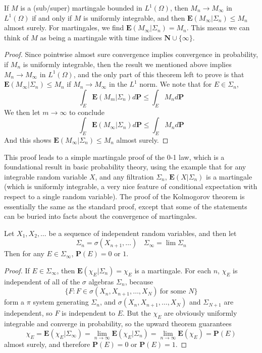 \begin{corollary}
    If $M$ is a (sub/super) martingale bounded in $L^1(\Omega)$, then $M_n \to M_\infty$ in $L^1(\Omega)$ if and only if $M$ is uniformly integrable, and then $\mathbf{E}(M_\infty | \Sigma_n) \leq M_n$ almost surely. For martingales, we find $\mathbf{E}(M_\infty | \Sigma_n) = M_n$. This means we can think of $M$ as being a martingale with time indices $\mathbf{N} \cup \{ \infty \}$.
\end{corollary}
\begin{proof}
    Since pointwise almost sure convergence implies convergence in probability, if $M_n$ is uniformly integrable, then the result we mentioned above implies $M_n \to M_\infty$ in $L^1(\Omega)$, and the only part of this theorem left to prove is that $\mathbf{E}(M_\infty|\Sigma_n) \leq M_n$ if $M_n \to M_\infty$ in the $L^1$ norm. We note that for $E \in \Sigma_n$,
    \[ \int_E \mathbf{E}(M_m|\Sigma_n) d\mathbf{P} \leq \int_E M_n d\mathbf{P}  \]
    We then let $m \to \infty$ to conclude
    \[ \int_E \mathbf{E}(M_\infty|\Sigma_n) d\mathbf{P} \leq \int_E M_n d\mathbf{P} \]
    And this shows $\mathbf{E}(M_\infty|\Sigma_n) \leq M_n$ almost surely.
\end{proof}

This proof leads to a simple martingale proof of the 0-1 law, which is a foundational result in basic probability theory, using the example that for any integrable random variable $X$, and any filtration $\Sigma_n$, $\mathbf{E}(X|\Sigma_n)$ is a martingale (which is uniformly integrable, a very nice feature of conditional expectation with respect to a single random variable). The proof of the Kolmogorov theorem is essentially the same as the standard proof, except that some of the statements can be buried into facts about the convergence of martingales.

\begin{corollary}
    Let $X_1, X_2, \dots$ be a sequence of independent random variables, and then let
    \[ \Sigma_n = \sigma(X_{n+1}, \dots)\ \ \ \ \Sigma_\infty = \lim \Sigma_n \]
    Then for any $E \in \Sigma_\infty$, $\mathbf{P}(E) = 0$ or $1$.
\end{corollary}
\begin{proof}
    If $E \in \Sigma_\infty$, then $\mathbf{E}(\chi_E | \Sigma_n) = \chi_E$ is a martingale. For each $n$, $\chi_E$ is independent of all of the $\sigma$ algebras $\Sigma_n$, because
    \[ \{ F: F \in \sigma(X_n, X_{n+1}, \dots, X_N)\ \text{for some $N$} \} \]
    form a $\pi$ system generating $\Sigma_n$, and $\sigma(X_n,X_{n+1}, \dots, X_N)$ and $\Sigma_{N+1}$ are independent, so $F$ is independent to $E$. But the $\chi_E$ are obviously uniformly integrable and converge in probability, so the upward theorem guarantees
    \[ \chi_E = \mathbf{E}(\chi_E|\Sigma_\infty) = \lim_{n \to \infty} \mathbf{E}(\chi_E|\Sigma_n) = \lim_{n \to \infty} \mathbf{E}(\chi_E) = \mathbf{P}(E) \]
    almost surely, and therefore $\mathbf{P}(E) = 0$ or $\mathbf{P}(E) = 1$.
\end{proof}

